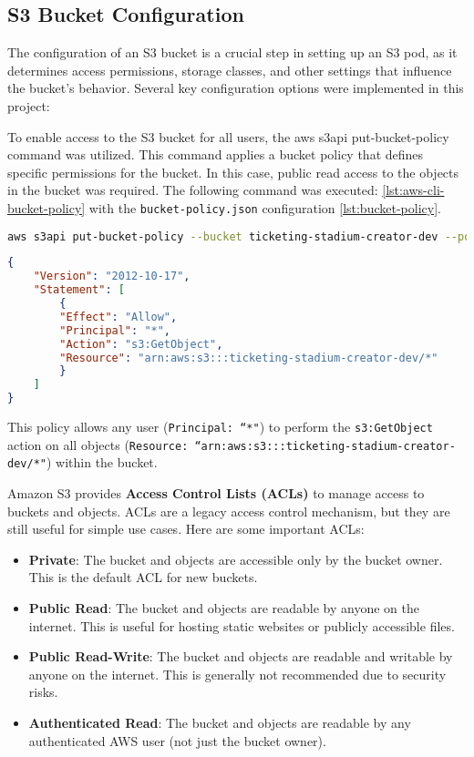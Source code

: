 \subsection{S3 Bucket Configuration}
The configuration of an S3 bucket is a crucial step in setting up an S3 pod, as it determines access permissions, storage classes, and other settings that influence the bucket’s behavior. Several key configuration options were implemented in this project:

To enable access to the S3 bucket for all users, the aws s3api put-bucket-policy command was utilized. This command applies a bucket policy that defines specific permissions for the bucket. In this case, public read access to the objects in the bucket was required. The following command was executed: \ref{lst:aws-cli-bucket-policy} with the \texttt{bucket-policy.json} configuration \ref{lst:bucket-policy}.

\begin{lstlisting}[language=bash, caption={AWS CLI command to set a bucket policy}, label={lst:aws-cli-bucket-policy}]
aws s3api put-bucket-policy --bucket ticketing-stadium-creator-dev --policy file://bucket-policy.json
\end{lstlisting}

\begin{lstlisting}[language=json,caption=Bucket policy JSON configuration, label=lst:bucket-policy]
{
    "Version": "2012-10-17",
    "Statement": [
        {
        "Effect": "Allow",
        "Principal": "*",
        "Action": "s3:GetObject",
        "Resource": "arn:aws:s3:::ticketing-stadium-creator-dev/*"
        }
    ]
}
\end{lstlisting}

This policy allows any user (\texttt{Principal: ``*"}) to perform the \texttt{s3:GetObject} action on all objects (\texttt{Resource: ``arn:aws:s3:::ticketing-stadium-creator-dev/*"}) within the bucket.

Amazon S3 provides \textbf{Access Control Lists (ACLs)} to manage access to buckets and objects. ACLs are a legacy access control mechanism, but they are still useful for simple use cases. Here are some important ACLs:

\begin{itemize}
    \item \textbf{Private}: The bucket and objects are accessible only by the bucket owner. This is the default ACL for new buckets.
    \item \textbf{Public Read}: The bucket and objects are readable by anyone on the internet. This is useful for hosting static websites or publicly accessible files.
    \item \textbf{Public Read-Write}: The bucket and objects are readable and writable by anyone on the internet. This is generally not recommended due to security risks.
    \item \textbf{Authenticated Read}: The bucket and objects are readable by any authenticated AWS user (not just the bucket owner).
\end{itemize}

